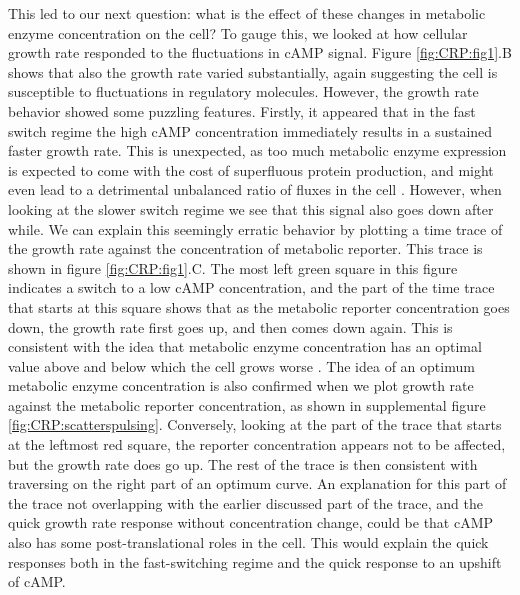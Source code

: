 This led to our next question: what is the effect of these changes in metabolic enzyme concentration on the cell? 
%
To gauge this, we looked at how cellular growth rate responded to the fluctuations in cAMP signal. 
%
Figure \ref{fig:CRP:fig1}.B shows that also the growth rate varied substantially, again suggesting the cell is susceptible to fluctuations in regulatory molecules. 
%
However, the growth rate behavior showed some puzzling features. 
%
Firstly, it appeared that in the fast switch regime the high cAMP concentration immediately results in a sustained faster growth rate.
This is unexpected, as too much metabolic enzyme expression is expected to come with the cost of superfluous protein production, and might even lead to a detrimental unbalanced ratio of fluxes in the cell \cite{Ray2016}.
%
However, when looking at the slower switch regime we see that this signal also goes down after while. 
%
We can explain this seemingly erratic behavior by plotting a time trace of the growth rate against the concentration of metabolic reporter.
%
This trace is shown in figure \ref{fig:CRP:fig1}.C. 
%
The most left green square in this figure indicates a switch to a low cAMP concentration, and the part of the time trace that starts at this square shows that as the metabolic reporter concentration goes down, the growth rate first goes up, and then comes down again. 
This is consistent with the idea that metabolic enzyme concentration has an optimal value above and below which the cell grows worse \cite{Jensen1993, Dekel2005, Berkhout2013, Ray2016, Towbin2017}.
%
The idea of an optimum metabolic enzyme concentration is also confirmed when we plot growth rate against the metabolic reporter concentration, as shown in supplemental figure \ref{fig:CRP:scatterspulsing}. 
%
Conversely, looking at the part of the trace that starts at the leftmost red square, the reporter concentration appears not to be affected, but the growth rate does go up.
%
The rest of the trace is then consistent with traversing on the right part of an optimum curve.
%
An explanation for this part of the trace not overlapping with the earlier discussed part of the trace, and the quick growth rate response without concentration change, 
could be that cAMP also has some post-translational roles in the cell. 
This would explain the quick responses both in the fast-switching regime and the quick response to an upshift of cAMP.


